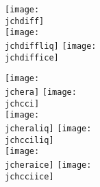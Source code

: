 




\begin{figure}[!ht]
  \centering
  \texttt{[image: \\jchdiff]} \\
  \texttt{[image: \\jchdiffliq]}
  \texttt{[image: \\jchdiffice]} 
  \caption[Joint cloud proptery histograms (difference).]{\jchdiffcaption}\label{fig:jchdiff}
\end{figure}

\begin{figure}[!ht]
  \centering
  \texttt{[image: \\jchera]} 
  \texttt{[image: \\jchcci]} \\
  \texttt{[image: \\jcheraliq]}
  \texttt{[image: \\jchcciliq]} \\
  \texttt{[image: \\jcheraice]}
  \texttt{[image: \\jchcciice]} 
  \caption[Joint cloud proptery histograms.]{\jchcaption}
  \label{fig:jch}
\end{figure}



